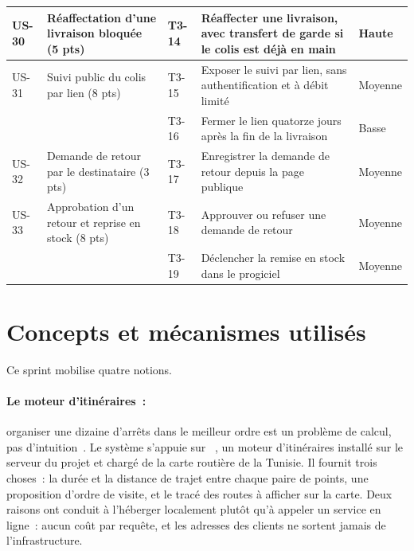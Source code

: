 \begin{small}
\begin{longtable}{L{1.1cm}L{3.0cm}L{1.2cm}L{7.0cm}L{1.4cm}}
\hline
US-30 & Réaffectation d'une livraison bloquée (5 pts) & T3-14 & Réaffecter une livraison, avec transfert de garde si le colis est déjà en main & Haute \\
\hline
US-31 & Suivi public du colis par lien (8 pts) & T3-15 & Exposer le suivi par lien, sans authentification et à débit limité & Moyenne \\
\hline
      &  & T3-16 & Fermer le lien quatorze jours après la fin de la livraison & Basse \\
\hline
US-32 & Demande de retour par le destinataire (3 pts) & T3-17 & Enregistrer la demande de retour depuis la page publique & Moyenne \\
\hline
US-33 & Approbation d'un retour et reprise en stock (8 pts) & T3-18 & Approuver ou refuser une demande de retour & Moyenne \\
\hline
      &  & T3-19 & Déclencher la remise en stock dans le progiciel & Moyenne \\
\hline
\end{longtable}
\end{small}

\section{Concepts et mécanismes utilisés}

Ce sprint mobilise quatre notions.

\paragraph{Le moteur d'itinéraires~:} organiser une dizaine d'arrêts dans le meilleur ordre est un
problème de calcul, pas d'intuition~\cite{toth14}. Le système s'appuie sur ~\cite{vetter11}, un moteur d'itinéraires
installé sur le serveur du projet et chargé de la carte routière de la Tunisie. Il fournit trois
choses~: la durée et la distance de trajet entre chaque paire de points, une proposition d'ordre de
visite, et le tracé des routes à afficher sur la carte. Deux raisons ont conduit à l'héberger
localement plutôt qu'à appeler un service en ligne~: aucun coût par requête, et les adresses des
clients ne sortent jamais de l'infrastructure.

